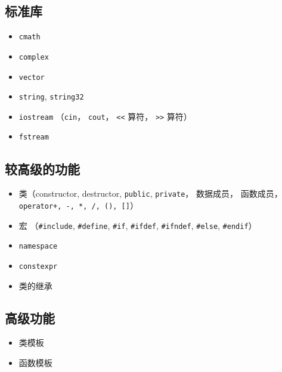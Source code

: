 \subsection{标准库}
\begin{itemize}
\item \verb|cmath|
\item \verb|complex|
\item \verb|vector|
\item \verb|string|, \verb|string32|
\item \verb|iostream| （\verb|cin|， \verb|cout|， \verb|<<| 算符， \verb|>>| 算符）
\item \verb|fstream|
\end{itemize}

\subsection{较高级的功能}
\begin{itemize}
\item 类（constructor, destructor, \verb|public|, \verb|private|， 数据成员， 函数成员， \verb|operator+, -, *, /, (), []|）
\item 宏 （\verb|#include|, \verb|#define|, \verb|#if|, \verb|#ifdef|, \verb|#ifndef|, \verb|#else|, \verb|#endif|）
\item \verb|namespace|
\item \verb|constexpr|
\item 类的继承
\end{itemize}

\subsection{高级功能}
\begin{itemize}
\item 类模板
\item 函数模板
\end{itemize}
